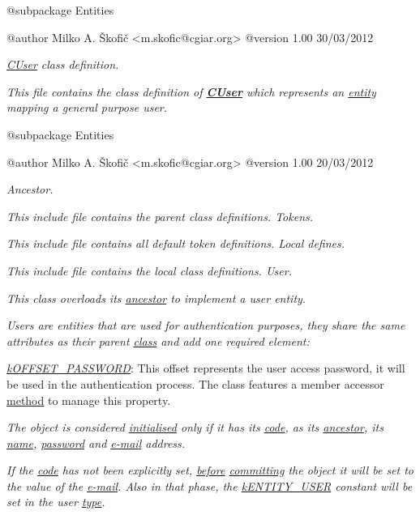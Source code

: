 {\itshape \begin{DoxyVerb} @subpackage        Entities

 @author            Milko A. Škofič <m.skofic@cgiar.org>
 @version   1.00 30/03/2012\end{DoxyVerb}
}

{\itshape {\itshape \hyperlink{class_c_user}{C\-User}} class definition.}

{\itshape This file contains the class definition of {\bfseries \hyperlink{class_c_user}{C\-User}} which represents an \hyperlink{class_c_entity}{entity} mapping a general purpose user.}

{\itshape \begin{DoxyVerb} @subpackage        Entities

 @author            Milko A. Škofič <m.skofic@cgiar.org>
 @version   1.00 20/03/2012\end{DoxyVerb}
}

{\itshape Ancestor.}

{\itshape This include file contains the parent class definitions. Tokens.}

{\itshape This include file contains all default token definitions. Local defines.}

{\itshape This include file contains the local class definitions. User.}

{\itshape This class overloads its \hyperlink{class_c_entity}{ancestor} to implement a user entity.}

{\itshape Users are entities that are used for authentication purposes, they share the same attributes as their parent \hyperlink{class_c_entity}{class} and add one required element\-:}

{\itshape 
\begin{DoxyItemize}
\item {\itshape \hyperlink{}{k\-O\-F\-F\-S\-E\-T\-\_\-\-P\-A\-S\-S\-W\-O\-R\-D}}\-: This offset represents the user access password, it will be used in the authentication process. The class features a member accessor \hyperlink{}{method} to manage this property. 
\end{DoxyItemize}}

{\itshape The object is considered \hyperlink{}{initialised} only if it has its \hyperlink{}{code}, as its \hyperlink{class_c_entity}{ancestor}, its \hyperlink{}{name}, \hyperlink{}{password} and \hyperlink{}{e-\/mail} address.}

{\itshape If the \hyperlink{}{code} has not been explicitly set, \hyperlink{}{before} \hyperlink{}{committing} the object it will be set to the value of the \hyperlink{}{e-\/mail}. Also in that phase, the \hyperlink{}{k\-E\-N\-T\-I\-T\-Y\-\_\-\-U\-S\-E\-R} constant will be set in the user \hyperlink{}{type}.}

